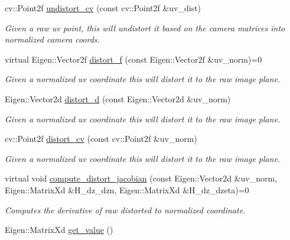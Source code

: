 \begin{DoxyCompactItemize}
cv\+::\+Point2f \hyperlink{classov__core_1_1CamBase_a42b140a7dfc1398cc7fc2f8df6c141d2}{undistort\+\_\+cv} (const cv\+::\+Point2f \&uv\+\_\+dist)
\begin{DoxyCompactList}\small\item\em Given a raw uv point, this will undistort it based on the camera matrices into normalized camera coords. \end{DoxyCompactList}\item 
virtual Eigen\+::\+Vector2f \hyperlink{classov__core_1_1CamBase_a00902793219107474dc21f762fb14556}{distort\+\_\+f} (const Eigen\+::\+Vector2f \&uv\+\_\+norm)=0
\begin{DoxyCompactList}\small\item\em Given a normalized uv coordinate this will distort it to the raw image plane. \end{DoxyCompactList}\item 
Eigen\+::\+Vector2d \hyperlink{classov__core_1_1CamBase_acf981dbc008c5929bf32ddde80b04caf}{distort\+\_\+d} (const Eigen\+::\+Vector2d \&uv\+\_\+norm)
\begin{DoxyCompactList}\small\item\em Given a normalized uv coordinate this will distort it to the raw image plane. \end{DoxyCompactList}\item 
cv\+::\+Point2f \hyperlink{classov__core_1_1CamBase_ae04e8fb6f5b61a7c9e9b7c22cfc1b82c}{distort\+\_\+cv} (const cv\+::\+Point2f \&uv\+\_\+norm)
\begin{DoxyCompactList}\small\item\em Given a normalized uv coordinate this will distort it to the raw image plane. \end{DoxyCompactList}\item 
virtual void \hyperlink{classov__core_1_1CamBase_a498fa2b56be008d7b59bf9927f60d5db}{compute\+\_\+distort\+\_\+jacobian} (const Eigen\+::\+Vector2d \&uv\+\_\+norm, Eigen\+::\+Matrix\+Xd \&H\+\_\+dz\+\_\+dzn, Eigen\+::\+Matrix\+Xd \&H\+\_\+dz\+\_\+dzeta)=0
\begin{DoxyCompactList}\small\item\em Computes the derivative of raw distorted to normalized coordinate. \end{DoxyCompactList}\item 
\mbox{\label{classov__core_1_1CamBase_aa8c2283f7db1a88b590c8058e8949150}} 
Eigen\+::\+Matrix\+Xd \hyperlink{classov__core_1_1CamBase_aa8c2283f7db1a88b590c8058e8949150}{get\+\_\+value} ()

\end{DoxyCompactItemize}
